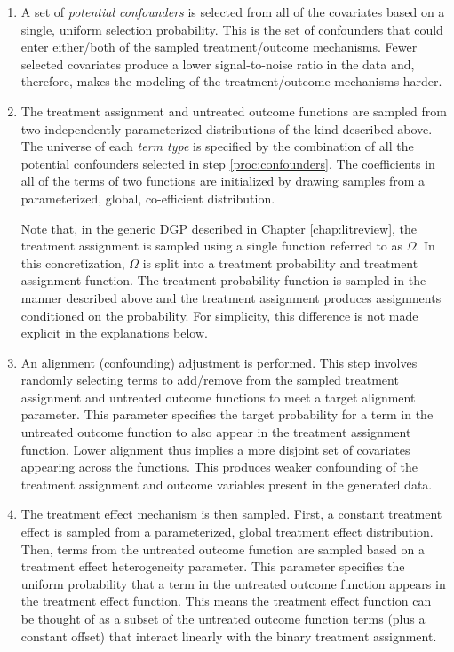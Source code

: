 \documentclass[../main.tex]{subfiles}
\begin{document}
\begin{enumerate}
    \item A set of \textit{potential confounders} is selected from all of the covariates based on a single, uniform selection probability. This is the set of confounders that could enter either/both of the sampled treatment/outcome mechanisms. Fewer selected covariates produce a lower signal-to-noise ratio in the data and, therefore, makes the modeling of the treatment/outcome mechanisms harder. \label{proc:confounders}

    \item The treatment assignment and untreated outcome functions are sampled from two independently parameterized distributions of the kind described above. The universe of each \textit{term type} is specified by the combination of all the potential confounders selected in step \ref{proc:confounders}. The coefficients in all of the terms of two functions are initialized by drawing samples from a parameterized, global, co-efficient distribution.

    \vspace{\baselineskip}

    Note that, in the generic DGP described in Chapter \ref{chap:litreview}, the treatment assignment is sampled using a single function referred to as $\Omega$. In this concretization, $\Omega$ is split into a treatment probability and treatment assignment function. The treatment probability function is sampled in the manner described above and the treatment assignment produces assignments conditioned on the probability. For simplicity, this difference is not made explicit in the explanations below.

    \item An alignment (confounding) adjustment is performed. This step involves randomly selecting terms to add/remove from the sampled treatment assignment and untreated outcome functions to meet a target alignment parameter. This parameter specifies the target probability for a term in the untreated outcome function to also appear in the treatment assignment function. Lower alignment thus implies a more disjoint set of covariates appearing across the functions. This produces weaker confounding of the treatment assignment and outcome variables present in the generated data.

    \item The treatment effect mechanism is then sampled. First, a constant treatment effect is sampled from a parameterized, global treatment effect distribution. Then, terms from the untreated outcome function are sampled based on a treatment effect heterogeneity parameter. This parameter specifies the uniform probability that a term in the untreated outcome function appears in the treatment effect function. This means the treatment effect function can be thought of as a subset of the untreated outcome function terms (plus a constant offset) that interact linearly with the binary treatment assignment.


\end{enumerate}
\end{document}
